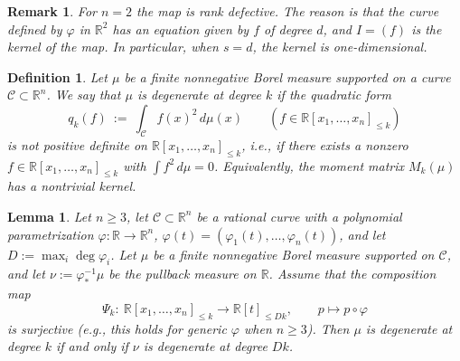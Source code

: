 \documentclass[11pt,a4paper]{amsart}
\numberwithin{equation}{section}
\newtheorem{lemma}[thm]{Lemma}
\newtheorem{definition}[thm]{Definition}
\newtheorem{remark}[thm]{Remark}
\theoremstyle{definition}
\newcommand{\R}{\mathbb{R}}
\numberwithin{thm}{section}
\theoremstyle{break}
\numberwithin{subcase}{case}
\begin{document}
\begin{remark}\label{rmk:n=2 notsurjective}
    For $n=2$ the map is rank defective. The reason is that the curve defined by $\varphi$ in $\R^2$ has an equation given by $f$ of degree $d$, and $I=(f)$ is the kernel of the map. In particular, when $s=d$, the kernel is one-dimensional.
\end{remark}
\begin{definition}
Let $\mu$ be a finite nonnegative Borel measure supported on a curve $\mathcal C\subset\R^n$.
We say that $\mu$ is \emph{degenerate at degree $k$} if the quadratic form
\[
q_k(f)\ :=\ \int_{\mathcal C} f(x)^2\,d\mu(x)\qquad(f\in\R[x_1,\dots,x_n]_{\le k})
\]
is not positive definite on $\R[x_1,\dots,x_n]_{\le k}$, i.e., if there exists a nonzero $f\in\R[x_1,\dots,x_n]_{\le k}$ with $\int f^2\,d\mu=0$.  
Equivalently, the moment matrix $M_k(\mu)$ has a nontrivial kernel. 
\end{definition}

\begin{lemma}
Let $n\ge 3$, let $\mathcal C\subset\R^n$ be a rational curve with a polynomial parametrization $\varphi:\R\to\R^n$, $\varphi(t)=(\varphi_1(t),\dots,\varphi_n(t))$, and let $D:=\max_i\deg\varphi_i$. Let $\mu$ be a finite nonnegative Borel measure supported on $\mathcal C$, and let $\nu:=\varphi^{-1}_*\mu$ be the pullback measure on $\R$. Assume that the composition map
\[
\Psi_k:\ \R[x_1,\dots,x_n]_{\le k}\longrightarrow \R[t]_{\le Dk},\qquad p\longmapsto p\circ\varphi
\]
is surjective (e.g., this holds for generic $\varphi$ when $n\ge 3$). Then $\mu$ is degenerate at degree $k$ if and only if $\nu$ is degenerate at degree $Dk$.
\end{lemma}
\end{document}
